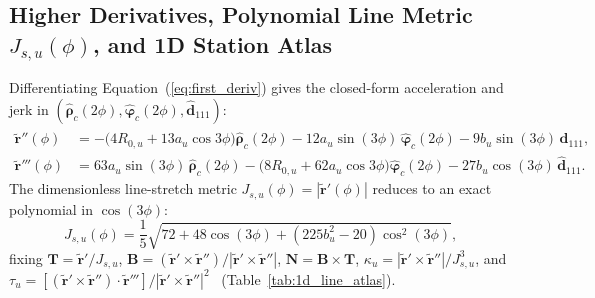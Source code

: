 \documentclass[11pt, a4paper]{article}
\begin{document}
\subsection{\texorpdfstring{Higher Derivatives, Polynomial Line Metric $J_{s,u}(\phi)$, and 1D Station Atlas}{Higher Derivatives, Polynomial Line Metric, and 1D Station Atlas}}
Differentiating Equation~(\ref{eq:first_deriv}) gives the closed-form acceleration and jerk in $(\hat{\boldsymbol{\rho}}_c(2\phi), \hat{\boldsymbol{\varphi}}_c(2\phi), \hat{\mathbf{d}}_{111})$:
\begin{align}
    \tilde{\mathbf{r}}''(\phi) &= -\big(4R_{0,u} + 13a_u\cos 3\phi\big)\hat{\boldsymbol{\rho}}_c(2\phi) - 12a_u\sin(3\phi)\,\hat{\boldsymbol{\varphi}}_c(2\phi) - 9b_u\sin(3\phi)\,\hat{\mathbf{d}}_{111}, \label{eq:second_deriv}\\
    \tilde{\mathbf{r}}'''(\phi) &= 63a_u\sin(3\phi)\,\hat{\boldsymbol{\rho}}_c(2\phi) - \big(8R_{0,u} + 62a_u\cos 3\phi\big)\hat{\boldsymbol{\varphi}}_c(2\phi) - 27b_u\cos(3\phi)\,\hat{\mathbf{d}}_{111}. \label{eq:third_deriv}
\end{align}
The dimensionless line-stretch metric $J_{s,u}(\phi) = |\tilde{\mathbf{r}}'(\phi)|$ reduces to an exact polynomial in $\cos(3\phi)$:
\begin{equation}
    J_{s,u}(\phi) = \frac{1}{5}\sqrt{72 + 48\cos(3\phi) + (225b_u^2 - 20)\cos^2(3\phi)},
    \label{eq:js_polynomial}
\end{equation}
fixing $\mathbf{T} = \tilde{\mathbf{r}}'/J_{s,u}$, $\mathbf{B} = (\tilde{\mathbf{r}}'\times\tilde{\mathbf{r}}'')/|\tilde{\mathbf{r}}'\times\tilde{\mathbf{r}}''|$, $\mathbf{N} = \mathbf{B}\times\mathbf{T}$, $\kappa_u = |\tilde{\mathbf{r}}'\times\tilde{\mathbf{r}}''|/J_{s,u}^3$, and $\tau_u = [(\tilde{\mathbf{r}}'\times\tilde{\mathbf{r}}'')\cdot\tilde{\mathbf{r}}''']/|\tilde{\mathbf{r}}'\times\tilde{\mathbf{r}}''|^2$~\cite{frenet1847} (Table~\ref{tab:1d_line_atlas}).
\end{document}
